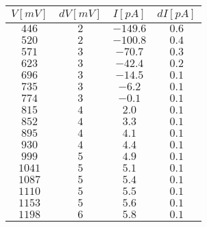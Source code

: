\begin{tabular}{cccc}
\hline
	$V[mV]$ & $dV[mV]$ & $I[pA]$ & $dI[pA]$\\ 
\hline
	$446$ & $2$ & $-149.6$ & $0.6$ \\
	$520$ & $2$ & $-100.8$ & $0.4$ \\
	$571$ & $3$ & $-70.7$ & $0.3$ \\
	$623$ & $3$ & $-42.4$ & $0.2$ \\
	$696$ & $3$ & $-14.5$ & $0.1$ \\
	$735$ & $3$ & $-6.2$ & $0.1$ \\
	$774$ & $3$ & $-0.1$ & $0.1$ \\
	$815$ & $4$ & $2.0$ & $0.1$ \\
	$852$ & $4$ & $3.3$ & $0.1$ \\
	$895$ & $4$ & $4.1$ & $0.1$ \\
	$930$ & $4$ & $4.4$ & $0.1$ \\
	$999$ & $5$ & $4.9$ & $0.1$ \\
	$1041$ & $5$ & $5.1$ & $0.1$ \\
	$1087$ & $5$ & $5.4$ & $0.1$ \\
	$1110$ & $5$ & $5.5$ & $0.1$ \\
	$1153$ & $5$ & $5.6$ & $0.1$ \\
	$1198$ & $6$ & $5.8$ & $0.1$ \\
\hline
\end{tabular}
